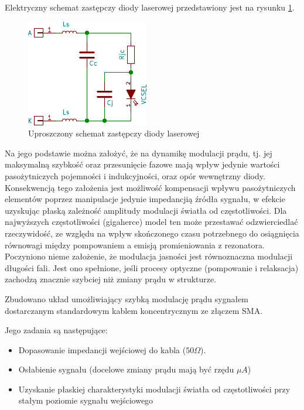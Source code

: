 \documentclass[a4paper,10pt]{article}
\begin{document}
Elektryczny schemat zastępczy diody laserowej przedstawiony jest na rysunku \ref{sch-mod1}.

\begin{figure}
\begin{center}
 \includegraphics{./obrazki/sch_mod1.pdf}
\end{center}
\caption{Uproszczony schemat zastępczy diody laserowej}
\label{sch-mod1}
\end{figure}

Na jego podstawie można założyć, że na dynamikę modulacji prądu, tj. jej maksymalną szybkość oraz przesunięcie fazowe mają wpływ jedynie wartości pasożytniczych pojemności i indukcyjności, oraz opór wewnętrzny diody. Konsekwencją tego założenia jest możliwość kompensacji wpływu pasożytniczych elementów poprzez manipulacje jedynie impedancjią źródła sygnału, w efekcie uzyskując płaską zależność amplitudy modulacji światła od częstotliwości.
Dla najwyższych częstotliwości (gigaherce) model ten może przestawać odzwierciedlać rzeczywidość, ze względu na wpływ skończonego czasu potrzebnego do osiągnięcia równowagi między pompowaniem a emisją promieniowania z rezonatora. Poczyniono nieme założenie, że modulacja jasności jest równoznaczna modulacji długości fali. Jest ono spełnione, jeśli procesy optyczne (pompowanie i relaksacja) zachodzą znacznie szybciej niż zmiany prądu w strukturze.

Zbudowano układ umożliwiający szybką modulację prądu sygnałem dostarczanym standardowym kablem koncentrycznym ze złączem SMA.

Jego zadania są następujące:
\begin{itemize}
 \item Dopasowanie impedancji wejściowej do kabla ($50 \Omega$).
 \item Osłabienie sygnału (docelowe zmiany prądu mają być rzędu $\mu A$)
 \item Uzyskanie płaskiej charakterystyki modulacji światła od częstotliwości przy stałym poziomie sygnału wejściowego
\end{itemize}
\end{document}
